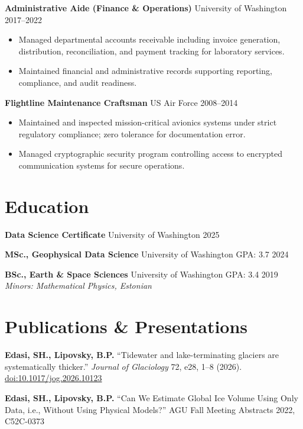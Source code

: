\documentclass[11pt,a4paper]{article}
\begin{document}
\vspace{0.2cm}
\noindent
\textbf{Administrative Aide (Finance \& Operations)} \hfill University of Washington \hfill 2017--2022
\begin{itemize}
    \item Managed departmental accounts receivable including invoice generation, distribution, reconciliation, and payment tracking for laboratory services.
    \item Maintained financial and administrative records supporting reporting, compliance, and audit readiness.
\end{itemize}

\vspace{0.2cm}
\noindent
\textbf{Flightline Maintenance Craftsman} \hfill US Air Force \hfill 2008--2014
\begin{itemize}
    \item Maintained and inspected mission-critical avionics systems under strict regulatory compliance; zero tolerance for documentation error.
    \item Managed cryptographic security program controlling access to encrypted communication systems for secure operations.
\end{itemize}

\section*{Education}

\noindent
\textbf{Data Science Certificate} \hfill University of Washington \hfill 2025

\vspace{0.1cm}
\noindent
\textbf{MSc., Geophysical Data Science} \hfill University of Washington \hfill GPA: 3.7 \hfill 2024

\vspace{0.1cm}
\noindent
\textbf{BSc., Earth \& Space Sciences} \hfill University of Washington \hfill GPA: 3.4 \hfill 2019 \\
\textit{Minors: Mathematical Physics, Estonian}

\section*{Publications \& Presentations}

\noindent
\textbf{Edasi, SH., Lipovsky, B.P.} ``Tidewater and lake-terminating glaciers are systematically thicker.'' \textit{Journal of Glaciology} 72, e28, 1--8 (2026). \href{https://doi.org/10.1017/jog.2026.10123}{doi:10.1017/jog.2026.10123}

\noindent
\textbf{Edasi, SH., Lipovsky, B.P.} ``Can We Estimate Global Ice Volume Using Only Data, i.e., Without Using Physical Models?'' AGU Fall Meeting Abstracts 2022, C52C-0373
\end{document}
